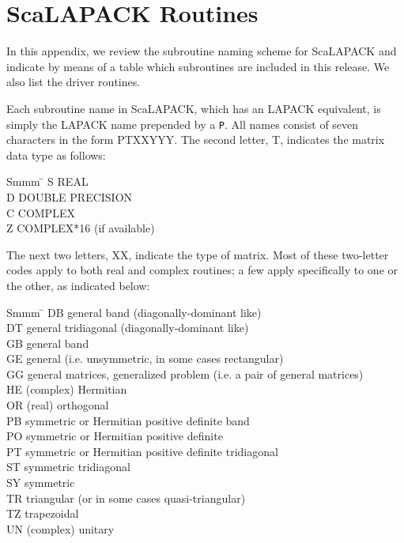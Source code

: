\documentclass[11pt]{report}
\def\thesection{\arabic{section}}
\begin{document}
\clearpage

\def\thesection{\thechapter.\arabic{section}}
\appendix


\chapter{ScaLAPACK Routines}\label{appendixa}

In this appendix, we review the subroutine naming scheme for ScaLAPACK
and indicate by means of a table which subroutines
are included in this release. We also list the driver routines.

Each subroutine name in ScaLAPACK, which has an LAPACK equivalent, is
simply the LAPACK name prepended by a {\tt P}.  All names consist of
seven characters in the form PTXXYYY.  The second letter, T, indicates the 
matrix data type as follows:
\begin{tabbing}
Smmm \= \kill
S \> REAL \\
D \> DOUBLE PRECISION \\
C \> COMPLEX \\
Z \> COMPLEX*16 (if available)
\end{tabbing}

The next two letters, XX, indicate the type of matrix. 
Most of these two-letter codes apply to both real and complex routines;
a few apply specifically to one or the other, as indicated below:

\begin{tabbing}
Smmm \= \kill
DB  \>  general band (diagonally-dominant like) \\
DT  \>  general tridiagonal (diagonally-dominant like) \\
GB  \>  general band \\
GE  \>  general (i.e. unsymmetric, in some cases rectangular) \\
GG  \>  general matrices, generalized problem (i.e. a pair of general matrices)\\
HE  \>  (complex) Hermitian \\
OR  \>  (real) orthogonal \\
PB  \>  symmetric or Hermitian positive definite band \\
PO  \>  symmetric or Hermitian positive definite \\
PT  \>  symmetric or Hermitian positive definite tridiagonal \\
ST  \>  symmetric tridiagonal \\
SY  \>  symmetric \\
TR  \>  triangular (or in some cases quasi-triangular)\\
TZ  \>  trapezoidal \\
UN  \>  (complex) unitary \\
\end{tabbing}
\end{document}

